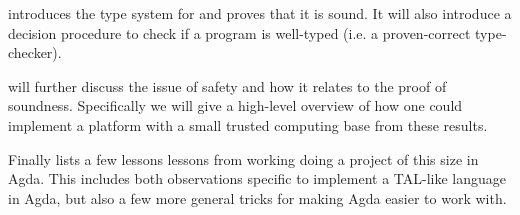 \textbf{} introduces the type system for \ATAL and proves that it is
sound. It will also introduce a decision procedure to check if a program is
well-typed (i.e. a proven-correct type-checker).

\textbf{} will further discuss the issue of safety and how it
relates to the proof of soundness. Specifically we will give a high-level
overview of how one could implement a platform with a small trusted computing
base from these results.

Finally \textbf{} lists a few lessons lessons from
working doing a project of this size in Agda. This includes both observations
specific to implement a TAL-like language in Agda, but also a few more general
tricks for making Agda easier to work with.
